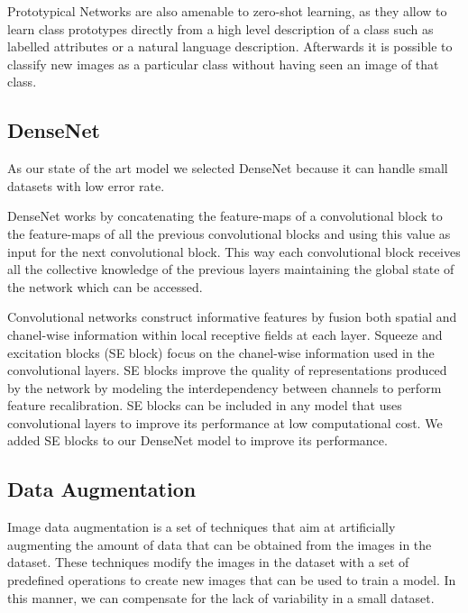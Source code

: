 Prototypical Networks are also amenable to zero-shot learning, as they allow to learn class prototypes directly from a high level description of a class such as labelled attributes or a natural language description. Afterwards it is possible to classify new images as a particular class without having seen an image of that class.

\subsection{DenseNet}

As our state of the art model we selected DenseNet because it can handle small datasets with low error rate\cite{pmlr-v80-pham18a}.

DenseNet \cite{densenet} works by concatenating the feature-maps of a convolutional block to the feature-maps of all the previous convolutional blocks and using this value as input for the next convolutional block. This way each convolutional block receives all the collective knowledge of the previous layers maintaining the global state of the network which can be accessed.

Convolutional networks construct informative features by fusion both spatial and chanel-wise information within local receptive fields at each layer. Squeeze and excitation blocks (SE block) \cite{Hu2017SqueezeandExcitationN} focus on the chanel-wise information used in the convolutional layers. SE blocks improve the quality of representations produced by the network by modeling the interdependency between channels to perform feature recalibration. SE blocks can be included in any model that uses convolutional layers to improve its performance at low computational cost. We added SE blocks to our DenseNet model to improve its performance.

\subsection{Data Augmentation}

Image data augmentation is a set of techniques that aim at artificially augmenting the amount of data that can be obtained from the images in the dataset. These techniques modify the images in the dataset  with a set of predefined operations to create new images that can be used to train a model.  In this manner, we can compensate  for the lack of  variability in a small dataset\cite{cubuk2019autoaugment}.
